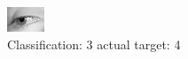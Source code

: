 \begin{figure}[h!]
\begin{center}
\includegraphics[width=0.60\columnwidth]{figures/ID3027_class_3_target_4.png}
\end{center}
\caption{ Classification: 3 actual target: 4}
\label{fig:ID3027_class_3_target_4}
\end{figure}
